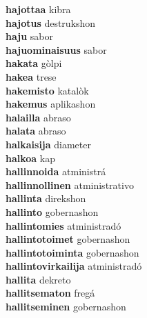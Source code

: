 \textbf{hajottaa } kibra \\
\textbf{hajotus } destrukshon \\
\textbf{haju } sabor \\
\textbf{hajuominaisuus } sabor \\
\textbf{hakata } gòlpi \\
\textbf{hakea } trese \\
\textbf{hakemisto } katalòk \\
\textbf{hakemus } aplikashon \\
\textbf{halailla } abraso \\
\textbf{halata } abraso \\
\textbf{halkaisija } diameter \\
\textbf{halkoa } kap \\
\textbf{hallinnoida } atministrá \\
\textbf{hallinnollinen } atministrativo \\
\textbf{hallinta } direkshon \\
\textbf{hallinto } gobernashon \\
\textbf{hallintomies } atministradó \\
\textbf{hallintotoimet } gobernashon \\
\textbf{hallintotoiminta } gobernashon \\
\textbf{hallintovirkailija } atministradó \\
\textbf{hallita } dekreto \\
\textbf{hallitsematon } fregá \\
\textbf{hallitseminen } gobernashon \\
